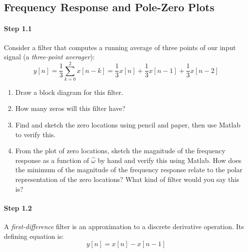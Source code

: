 \subsection{Frequency Response and Pole-Zero Plots}

\paragraph{Step 1.1} Consider a filter that computes a running average
of three points of our input signal (a \emph{three-point averager}):
\begin{equation}
y[n] = \frac{1}{3} \sum_{k=0}^2 x[n-k] 
     = \frac{1}{3}x[n] + \frac{1}{3}x[n-1] + \frac{1}{3}x[n-2]
\end{equation}

\begin{enumerate}\renewcommand{\theenumi}{\alph{enumi}}
\item Draw a block diagram for this filter.


\item How many zeros will this filter have?


\item Find and sketch the zero locations using pencil and paper, then
  use Matlab to verify this.

\item From the plot of zero locations, sketch the magnitude of the
  frequency response as a function of $\hat{\omega}$ by hand and
  verify this using Matlab. How does the minimum of the magnitude of
  the frequency response relate to the polar representation of the
  zero locations?  What kind of filter would you say this is?

\end{enumerate}


\paragraph{Step 1.2} A \emph{first-difference} filter is an
approximation to a discrete derivative operation. Its defining
equation is:
\begin{equation}
  y[n] = x[n] - x[n-1]
\end{equation}

